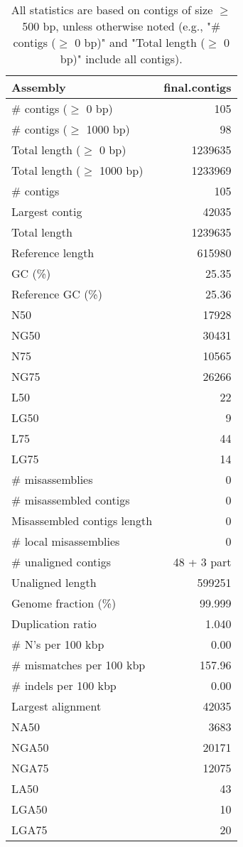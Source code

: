 \documentclass[12pt,a4paper]{article}
\begin{document}
\begin{table}[ht]
\begin{center}
\caption{All statistics are based on contigs of size $\geq$ 500 bp, unless otherwise noted (e.g., "\# contigs ($\geq$ 0 bp)" and "Total length ($\geq$ 0 bp)" include all contigs).}
\begin{tabular}{|l*{1}{|r}|}
\hline
Assembly & final.contigs \\ \hline
\# contigs ($\geq$ 0 bp) & 105 \\ \hline
\# contigs ($\geq$ 1000 bp) & 98 \\ \hline
Total length ($\geq$ 0 bp) & 1239635 \\ \hline
Total length ($\geq$ 1000 bp) & 1233969 \\ \hline
\# contigs & 105 \\ \hline
Largest contig & 42035 \\ \hline
Total length & 1239635 \\ \hline
Reference length & 615980 \\ \hline
GC (\%) & 25.35 \\ \hline
Reference GC (\%) & 25.36 \\ \hline
N50 & 17928 \\ \hline
NG50 & 30431 \\ \hline
N75 & 10565 \\ \hline
NG75 & 26266 \\ \hline
L50 & 22 \\ \hline
LG50 & 9 \\ \hline
L75 & 44 \\ \hline
LG75 & 14 \\ \hline
\# misassemblies & 0 \\ \hline
\# misassembled contigs & 0 \\ \hline
Misassembled contigs length & 0 \\ \hline
\# local misassemblies & 0 \\ \hline
\# unaligned contigs & 48 + 3 part \\ \hline
Unaligned length & 599251 \\ \hline
Genome fraction (\%) & 99.999 \\ \hline
Duplication ratio & 1.040 \\ \hline
\# N's per 100 kbp & 0.00 \\ \hline
\# mismatches per 100 kbp & 157.96 \\ \hline
\# indels per 100 kbp & 0.00 \\ \hline
Largest alignment & 42035 \\ \hline
NA50 & 3683 \\ \hline
NGA50 & 20171 \\ \hline
NGA75 & 12075 \\ \hline
LA50 & 43 \\ \hline
LGA50 & 10 \\ \hline
LGA75 & 20 \\ \hline
\end{tabular}
\end{center}
\end{table}
\end{document}
